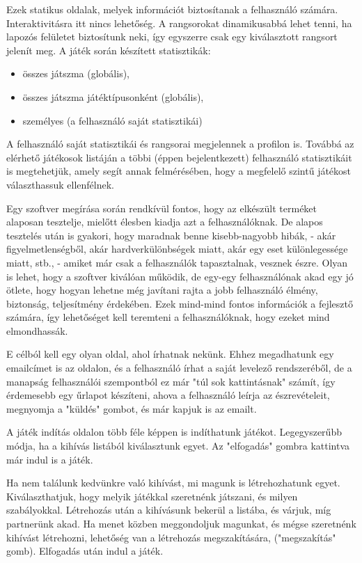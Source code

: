 Ezek statikus oldalak, melyek információt biztosítanak a felhasználó számára. Interaktivitásra itt nincs lehetőség. A rangsorokat dinamikusabbá lehet tenni, ha lapozós felületet biztosítunk neki, így egyszerre csak egy kiválasztott rangsort jelenít meg.
A játék során készített statisztikák:
\begin{itemize}
	\item összes játszma (globális),
	\item összes játszma játéktípusonként (globális),
	\item személyes (a felhasználó saját statisztikái)
\end{itemize}
A felhasználó saját statisztikái és rangsorai megjelennek a profilon is. Továbbá az elérhető játékosok listáján a többi (éppen bejelentkezett) felhasználó statisztikáit is megtehetjük, amely segít annak felmérésében, hogy a megfelelő szintű játékost választhassuk ellenfélnek.

Egy szoftver megírása során rendkívül fontos, hogy az elkészült terméket alaposan tesztelje, mielőtt élesben kiadja azt a felhasználóknak. De alapos tesztelés után is gyakori, hogy maradnak benne kisebb-nagyobb hibák, - akár figyelmetlenségből, akár hardverkülönbségek miatt, akár egy eset különlegessége miatt, stb., - amiket már csak a felhasználók tapasztalnak, vesznek észre. Olyan is lehet, hogy a szoftver kiválóan működik, de egy-egy felhasználónak akad egy jó ötlete, hogy hogyan lehetne még javítani rajta a jobb felhasználó élmény, biztonság, teljesítmény érdekében. Ezek mind-mind fontos információk a fejlesztő számára, így lehetőséget kell teremteni a felhasználóknak, hogy ezeket mind elmondhassák.

E célból kell egy olyan oldal, ahol írhatnak nekünk. Ehhez megadhatunk egy emailcímet is az oldalon, és a felhasználó írhat a saját levelező rendszeréből, de a manapság felhasználói szempontból ez már "túl sok kattintásnak" számít, így érdemesebb egy űrlapot készíteni, ahova a felhasználó leírja az észrevételeit, megnyomja a "küldés" gombot, és már kapjuk is az emailt.

A játék indítás oldalon több féle képpen is indíthatunk játékot. Legegyszerűbb módja, ha a kihívás listából kiválasztunk egyet. Az "elfogadás" gombra kattintva már indul is a játék.

Ha nem találunk kedvünkre való kihívást, mi magunk is létrehozhatunk egyet. Kiválaszthatjuk, hogy melyik játékkal szeretnénk játszani, és milyen szabályokkal. Létrehozás után a kihívásunk bekerül a listába, és várjuk, míg partnerünk akad. Ha menet közben meggondoljuk magunkat, és mégse szeretnénk kihívást létrehozni, lehetőség van a létrehozás megszakítására, ("megszakítás" gomb). Elfogadás után indul a játék.

